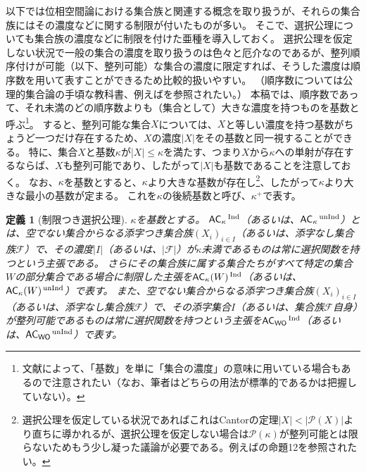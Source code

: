 \documentclass{jarticle}
\newtheorem{definition}{定義}
\newcommand{\WithIndex}[1]{$\textrm{#1}{}^{\,\textrm{\scriptsize Ind}}$}
\newcommand{\WithoutIndex}[1]{$\textrm{#1}{}^{\,\textrm{\scriptsize unInd}}$}
\begin{document}
以下では位相空間論における集合族と関連する概念を取り扱うが、それらの集合族にはその濃度などに関する制限が付いたものが多い。
そこで、選択公理についても集合族の濃度などに制限を付けた亜種を導入しておく。
選択公理を仮定しない状況で一般の集合の濃度を取り扱うのは色々と厄介なのであるが、整列順序付けが可能（以下、整列可能）な集合の濃度に限定すれば、そうした濃度は順序数を用いて表すことができるため比較的扱いやすい。
（順序数については公理的集合論の手頃な教科書、例えば\cite{Kunen}を参照されたい。）
本稿では、順序数であって、それ未満のどの順序数よりも（集合として）大きな濃度を持つものを基数と呼ぶ\footnote{文献によって、「基数」を単に「集合の濃度」の意味に用いている場合もあるので注意されたい（なお、筆者はどちらの用法が標準的であるかは把握していない）。}。
すると、整列可能な集合$X$については、$X$と等しい濃度を持つ基数がちょうど一つだけ存在するため、$X$の濃度$|X|$をその基数と同一視することができる。
特に、集合$X$と基数$\kappa$が$|X| \leq \kappa$を満たす、つまり$X$から$\kappa$への単射が存在するならば、$X$も整列可能であり、したがって$|X|$も基数であることを注意しておく。
なお、$\kappa$を基数とすると、$\kappa$より大きな基数が存在し\footnote{選択公理を仮定している状況であればこれはCantorの定理$|X| < |\mathcal{P}(X)|$より直ちに導かれるが、選択公理を仮定しない場合は$\mathcal{P}(\kappa)$が整列可能とは限らないためもう少し凝った議論が必要である。例えば\cite{alg-d_ord}の命題12を参照されたい。}、したがって$\kappa$より大きな最小の基数が定まる。
これを$\kappa$の後続基数と呼び、$\kappa^{+}$で表す。

\begin{definition}
[制限つき選択公理]
$\kappa$を基数とする。
\WithIndex{$\mathsf{AC}_{\kappa}$}（あるいは、\WithoutIndex{$\mathsf{AC}_{\kappa}$}）とは、空でない集合からなる添字つき集合族$(X_i)_{i \in I}$（あるいは、添字なし集合族$\mathcal{F}$）で、その濃度$|I|$（あるいは、$|\mathcal{F}|$）が$\kappa$未満であるものは常に選択関数を持つという主張である。
さらにその集合族に属する集合たちがすべて特定の集合$W$の部分集合である場合に制限した主張を\WithIndex{$\mathsf{AC}_{\kappa}(W)$}（あるいは、\WithoutIndex{$\mathsf{AC}_{\kappa}(W)$}）で表す。
また、空でない集合からなる添字つき集合族$(X_i)_{i \in I}$（あるいは、添字なし集合族$\mathcal{F}$）で、その添字集合$I$（あるいは、集合族$\mathcal{F}$自身）が整列可能であるものは常に選択関数を持つという主張を\WithIndex{$\mathsf{AC}_{\mathsf{WO}}$}（あるいは、\WithoutIndex{$\mathsf{AC}_{\mathsf{WO}}$}）で表す。
\end{definition}
\end{document}
